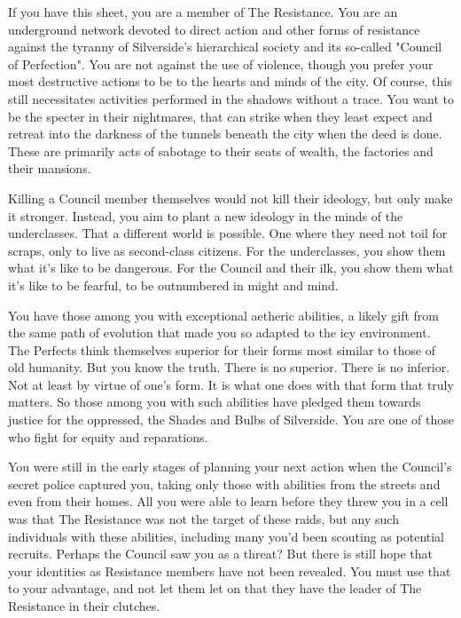 \documentclass[blue]{Silversiders}
\begin{document}
\name{\bResistance{}}

If you have this sheet, you are a member of The Resistance. You are an underground network devoted to direct action and other forms of resistance against the tyranny of Silverside's hierarchical society and its so-called "Council of Perfection". You are not against the use of violence, though you prefer your most destructive actions to be to the hearts and minds of the city. Of course, this still necessitates activities performed in the shadows without a trace. You want to be the specter in their nightmares, that can strike when they least expect and retreat into the darkness of the tunnels beneath the city when the deed is done. These are primarily acts of sabotage to their seats of wealth, the factories and their mansions. 

Killing a Council member themselves would not kill their ideology, but only make it stronger. Instead, you aim to plant a new ideology in the minds of the underclasses. That a different world is possible. One where they need not toil for scraps, only to live as second-class citizens. For the underclasses, you show them what it's like to be dangerous. For the Council and their ilk, you show them what it's like to be fearful, to be outnumbered in might and mind.

You have those among you with exceptional aetheric abilities, a likely gift from the same path of evolution that made you so adapted to the icy environment. The Perfects think themselves superior for their forms most similar to those of old humanity. But you know the truth. There is no superior. There is no inferior. Not at least by virtue of one's form. It is what one does with that form that truly matters. So those among you with such abilities have pledged them towards justice for the oppressed, the Shades and Bulbs of Silverside. You are one of those who fight for equity and reparations.

You were still in the early stages of planning your next action when the Council's secret police captured you, taking only those with abilities from the streets and even from their homes. All you were able to learn before they threw you in a cell was that The Resistance was not the target of these raids, but any such individuals with these abilities, including many you'd been scouting as potential recruits. Perhaps the Council saw you as a threat? But there is still hope that your identities as Resistance members have not been revealed.  You must use that to your advantage, and not let them let on that they have the leader of The Resistance in their clutches.
\end{document}
